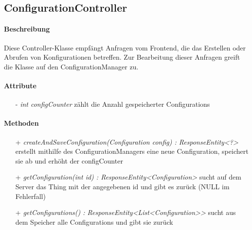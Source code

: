 \subsection{ConfigurationController}

\paragraph{Beschreibung}
Diese Controller-Klasse empfängt Anfragen vom Frontend, die das Erstellen oder Abrufen von Konfigurationen betreffen. Zur Bearbeitung dieser Anfragen greift die Klasse auf den ConfigurationManager zu.


\paragraph{Attribute}
\begin{itemize}
\item[-] \textit{int configCounter} zählt die Anzahl gespeicherter Configurations
\end{itemize}

\paragraph{Methoden}
\begin{itemize}
\item[+] \textit{ createAndSaveConfiguration(Configuration config) : ResponseEntity<?> }
erstellt mithilfe des ConfigurationManagers eine neue Configuration, speichert sie ab und erhöht der configCounter
\item[+] \textit{getConfiguration(int id) : ResponseEntity<Configuration>}
sucht auf dem Server das Thing mit der angegebenen id und gibt es zurück (NULL im Fehlerfall)
\item[+] \textit{getConfigurations() : ResponseEntity<List<Configuration>> }
sucht aus dem Speicher alle Configurations und gibt sie zurück
\end{itemize}